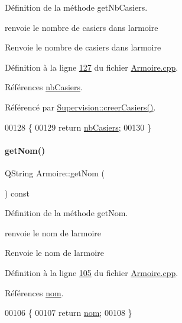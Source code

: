 Définition de la méthode get\+Nb\+Casiers. 

renvoie le nombre de casiers dans l\textquotesingle{}armoire \begin{DoxyReturn}{Renvoie}
le nombre de casiers dans l\textquotesingle{}armoire 
\end{DoxyReturn}


Définition à la ligne \hyperlink{_armoire_8cpp_source_l00127}{127} du fichier \hyperlink{_armoire_8cpp_source}{Armoire.\+cpp}.



Références \hyperlink{_armoire_8h_source_l00069}{nb\+Casiers}.



Référencé par \hyperlink{_supervision_8cpp_source_l00090}{Supervision\+::creer\+Casiers()}.


\begin{DoxyCode}
00128 \{
00129     \textcolor{keywordflow}{return} \hyperlink{class_armoire_a9c4e926b7cddb13d097b75b3f5ef3de8}{nbCasiers};
00130 \}
\end{DoxyCode}
\mbox{\label{class_armoire_a0045e45e0c9a465af765667344ce8bee}} 
\paragraph{\texorpdfstring{get\+Nom()}{getNom()}}
{\footnotesize\ttfamily Q\+String Armoire\+::get\+Nom (\begin{DoxyParamCaption}{ }\end{DoxyParamCaption}) const}



Définition de la méthode get\+Nom. 

renvoie le nom de l\textquotesingle{}armoire \begin{DoxyReturn}{Renvoie}
le nom de l\textquotesingle{}armoire 
\end{DoxyReturn}


Définition à la ligne \hyperlink{_armoire_8cpp_source_l00105}{105} du fichier \hyperlink{_armoire_8cpp_source}{Armoire.\+cpp}.



Références \hyperlink{_armoire_8h_source_l00067}{nom}.


\begin{DoxyCode}
00106 \{
00107     \textcolor{keywordflow}{return} \hyperlink{class_armoire_a1de028da0fa3f085e2feaad8311d8795}{nom};
00108 \}
\end{DoxyCode}
\mbox{\label{class_armoire_a1fc00ceaa842f579ee31c532a9b01508}} 
